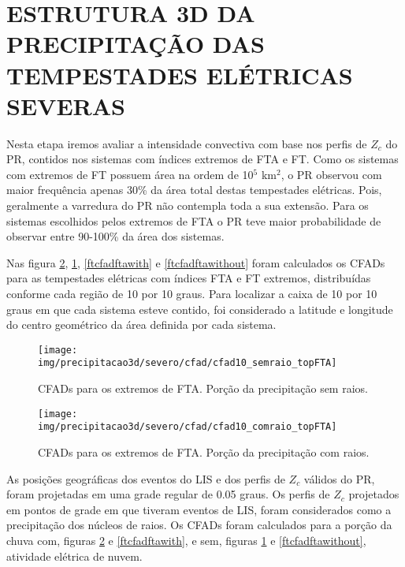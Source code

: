
\section{ESTRUTURA 3D DA PRECIPITAÇÃO DAS TEMPESTADES ELÉTRICAS SEVERAS}

Nesta etapa iremos avaliar a intensidade convectiva com base nos perfis de $Z_c$ do PR, contidos nos sistemas com índices extremos de FTA e FT. Como os sistemas com extremos de FT possuem área na ordem de 10$^5$ km$^2$, o PR observou com maior frequência apenas  30\% da área total destas tempestades elétricas. Pois, geralmente a varredura do PR não contempla toda a sua extensão. Para os sistemas escolhidos pelos extremos de FTA o PR teve maior probabilidade de observar entre 90-100\% da área dos sistemas.

Nas figura \ref{ftacfadftawith}, \ref{ftacfadftawithout}, \ref{ftcfadftawith} e \ref{ftcfadftawithout} foram calculados os CFADs para as tempestades elétricas com índices FTA e FT extremos, distribuídas conforme cada região de 10 por 10 graus. Para localizar a caixa de 10 por 10 graus em que cada sistema esteve contido, foi considerado a latitude e longitude do centro geométrico da área definida por cada sistema.


\begin{figure}[!ht]
  \centering
  \texttt{[image: img/precipitacao3d/severo/cfad/cfad10\_semraio\_topFTA]}
 \caption{CFADs para os extremos de FTA. Porção da precipitação sem raios.}
 \label{ftacfadftawithout}
\end{figure} 

\begin{figure}[!ht]
  \centering
  \texttt{[image: img/precipitacao3d/severo/cfad/cfad10\_comraio\_topFTA]}
  \caption{CFADs para os extremos de FTA. Porção da precipitação com raios.}
  \label{ftacfadftawith}   
\end{figure} 

As posições geográficas dos eventos do LIS e dos perfis de $Z_c$ válidos do PR, foram projetadas em uma grade regular de 0.05 graus. Os perfis de $Z_c$ projetados em pontos de grade em que tiveram eventos de LIS, foram considerados como a precipitação dos núcleos de raios. Os CFADs foram calculados para a porção da chuva com, figuras \ref{ftacfadftawith} e \ref{ftcfadftawith}, e sem, figuras \ref{ftacfadftawithout} e \ref{ftcfadftawithout}, atividade elétrica de nuvem.

